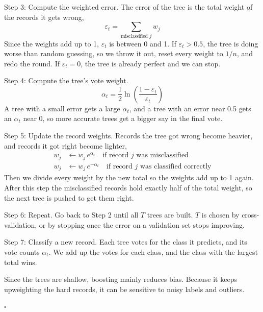 \documentclass[12pt,letterpaper, onecolumn]{exam}
\begin{document}
\begin{questions}
\begin{solution}
        Step 3: Compute the weighted error. The error of the tree is the total weight of the records it gets wrong,
        \begin{equation*}
            \varepsilon_t = \sum_{\text{misclassified } j} w_j
        \end{equation*}
        Since the weights add up to 1, $\varepsilon_t$ is between 0 and 1. If $\varepsilon_t > 0.5$, the tree is doing worse than random guessing, so we throw it out, reset every weight to $1/n$, and redo the round. If $\varepsilon_t = 0$, the tree is already perfect and we can stop.

        Step 4: Compute the tree's vote weight.
        \begin{equation*}
            \alpha_t = \frac{1}{2}\ln\left(\frac{1-\varepsilon_t}{\varepsilon_t}\right)
        \end{equation*}
        A tree with a small error gets a large $\alpha_t$, and a tree with an error near 0.5 gets an $\alpha_t$ near 0, so more accurate trees get a bigger say in the final vote.

        Step 5: Update the record weights. Records the tree got wrong become heavier, and records it got right become lighter,
        \begin{align*}
            w_j &\leftarrow w_j\, e^{\alpha_t} \quad \text{if record } j \text{ was misclassified}\\
            w_j &\leftarrow w_j\, e^{-\alpha_t} \quad \text{if record } j \text{ was classified correctly}
        \end{align*}
        Then we divide every weight by the new total so the weights add up to 1 again. After this step the misclassified records hold exactly half of the total weight, so the next tree is pushed to get them right.

        Step 6: Repeat. Go back to Step 2 until all $T$ trees are built. $T$ is chosen by cross-validation, or by stopping once the error on a validation set stops improving.

        Step 7: Classify a new record. Each tree votes for the class it predicts, and its vote counts $\alpha_t$. We add up the votes for each class, and the class with the largest total wins.

        Since the trees are shallow, boosting mainly reduces bias. Because it keeps upweighting the hard records, it can be sensitive to noisy labels and outliers.

        $\square$
    \end{solution}

\end{questions}
\end{document}
